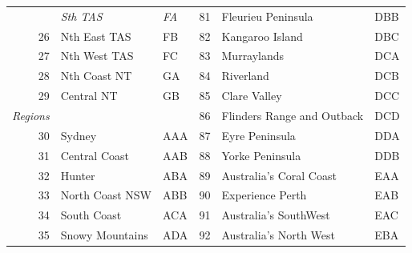 \documentclass[a4paper,11pt]{article}
\theoremstyle{definition}
\begin{document}
\begin{table}[H]
\begin{tabular}{r l l|r l l}
		                                     & \textit{Sth TAS}        & \textit{FA}    & 81                                              & Fleurieu Peninsula              & DBB            \\
		26                                   & Nth East TAS            & FB             & 82                                              & Kangaroo Island                 & DBC            \\
		27                                   & Nth West TAS            & FC             & 83                                              & Murraylands                     & DCA            \\
		28                                   & Nth Coast NT            & GA             & 84                                              & Riverland                       & DCB            \\
		29                                   & Central NT              & GB             & 85                                              & Clare Valley                    & DCC            \\
		\cline{1-3}
		\multicolumn{1}{l}{\textit{Regions}} &                         &                & 86                                              & Flinders Range and Outback      & DCD            \\
		30                                   & Sydney                  & AAA            & 87                                              & Eyre Peninsula                  & DDA            \\
		31                                   & Central Coast           & AAB            & 88                                              & Yorke Peninsula                 & DDB            \\
		32                                   & Hunter                  & ABA            & 89                                              & Australia’s Coral Coast         & EAA            \\
		33                                   & North Coast NSW         & ABB            & 90                                              & Experience Perth                & EAB            \\
		34                                   & South Coast             & ACA            & 91                                              & Australia’s SouthWest           & EAC            \\
		35                                   & Snowy Mountains         & ADA            & 92                                              & Australia’s North West          & EBA            \\

\end{tabular}
\end{table}
\end{document}
